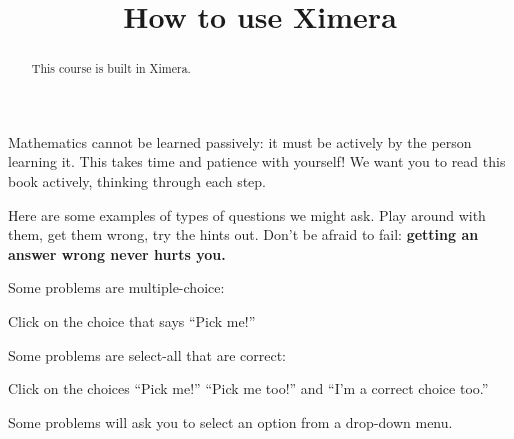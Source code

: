 \documentclass{ximera}
\title{How to use Ximera}
\begin{document}
\begin{abstract}
  This course is built in Ximera.
\end{abstract}\maketitle

Mathematics cannot be learned passively: it must be actively
by the person learning it.  This takes time and patience with yourself!
We want you to read this book actively, thinking through each step.

Here are some examples of types of questions we might ask.  Play around 
with them, get them wrong, try the
hints out.  Don't be afraid to fail: \textbf{getting an answer wrong
  never hurts you.}


\begin{example}
  Some problems are multiple-choice:
  \begin{multipleChoice}
  \end{multipleChoice}
  \begin{feedback}
    Click on the choice that says ``Pick me!''
  \end{feedback}
\end{example}


\begin{example}
  Some problems are select-all that are correct:
  \begin{selectAll}
  \end{selectAll}
  \begin{feedback}
    Click on the choices ``Pick me!'' ``Pick me too!'' and ``I'm a correct choice too.''
  \end{feedback}
\end{example}


\begin{example}
    Some problems will ask you to select an option from a drop-down menu. 
\end{example}
\end{document}
